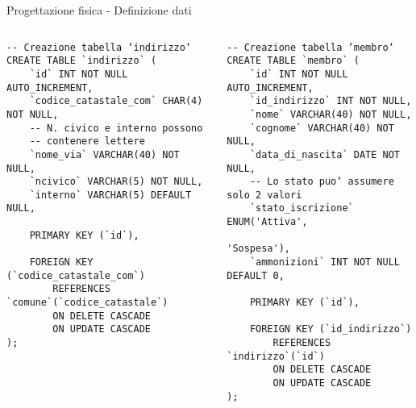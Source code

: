 \begin{frame}[fragile]{Progettazione fisica - Definizione dati}
    \begin{columns}[T]
        \begin{column}[T]{.45\textwidth}
            \begin{verbatim}
-- Creazione tabella ‘indirizzo‘
CREATE TABLE `indirizzo` (
    `id` INT NOT NULL AUTO_INCREMENT,
    `codice_catastale_com` CHAR(4) NOT NULL,
    -- N. civico e interno possono
    -- contenere lettere
    `nome_via` VARCHAR(40) NOT NULL,
    `ncivico` VARCHAR(5) NOT NULL,
    `interno` VARCHAR(5) DEFAULT NULL,

    PRIMARY KEY (`id`),

    FOREIGN KEY (`codice_catastale_com`)
        REFERENCES `comune`(`codice_catastale`)
        ON DELETE CASCADE
        ON UPDATE CASCADE
);
            \end{verbatim}
        \end{column}
        \begin{column}[T]{.45\textwidth}
            \begin{verbatim}
-- Creazione tabella ‘membro‘
CREATE TABLE `membro` (
    `id` INT NOT NULL AUTO_INCREMENT,
    `id_indirizzo` INT NOT NULL,
    `nome` VARCHAR(40) NOT NULL,
    `cognome` VARCHAR(40) NOT NULL,
    `data_di_nascita` DATE NOT NULL,
    -- Lo stato puo‘ assumere solo 2 valori
    `stato_iscrizione` ENUM('Attiva',
                            'Sospesa'),
    `ammonizioni` INT NOT NULL DEFAULT 0,

    PRIMARY KEY (`id`),

    FOREIGN KEY (`id_indirizzo`)
        REFERENCES `indirizzo`(`id`)
        ON DELETE CASCADE
        ON UPDATE CASCADE
);
            \end{verbatim}
        \end{column}
    \end{columns}
\end{frame}


